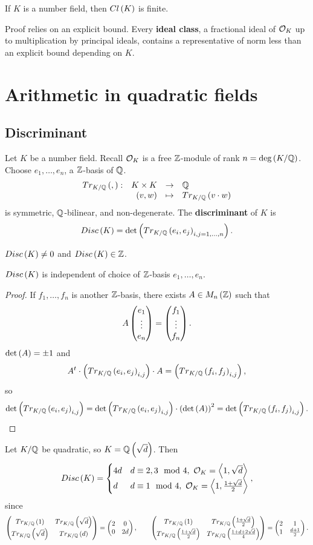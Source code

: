 \begin{theorem}
If $ K $ is a number field, then $ Cl\left( K \right) $ is finite.
\end{theorem}

Proof relies on an explicit bound. Every \textbf{ideal class}, a fractional ideal of $ \mathcal{O}_K $ up to multiplication by principal ideals, contains a representative of norm less than an explicit bound depending on $ K $.

\pagebreak

\section{Arithmetic in quadratic fields}

\subsection{Discriminant}

Let $ K $ be a number field. Recall $ \mathcal{O}_K $ is a free $ \mathbb{Z} $-module of rank $ n = \deg\left( K / \mathbb{Q} \right) $. Choose $ e_1, \dots, e_n $, a $ \mathbb{Z} $-basis of $ \mathbb{Q} $.
$$ \function[Tr_{K / \Q}\rb{,}]{K \times K}{\Q}{\rb{v, w}}{Tr_{K / \Q}\rb{v \cdot w}} $$
is symmetric, $ \mathbb{Q} $-bilinear, and non-degenerate. The \textbf{discriminant} of $ K $ is
$$ Disc\left( K \right) = \det\left( Tr_{K / \mathbb{Q}}\left( e_i, e_j \right)_{i, j = 1, \dots, n} \right). $$

\begin{remark*}
$ Disc\left( K \right) \ne 0 $ and $ Disc\left( K \right) \in \mathbb{Z} $.
\end{remark*}

\begin{lemma}
$ Disc\left( K \right) $ is independent of choice of $ \mathbb{Z} $-basis $ e_1, \dots, e_n $.
\end{lemma}

\begin{proof}
If $ f_1, \dots, f_n $ is another $ \mathbb{Z} $-basis, there exists $ A \in M_n\left( \mathbb{Z} \right) $ such that
$$ A\begin{pmatrix} e_1 \\ \vdots \\ e_n \end{pmatrix} = \begin{pmatrix} f_1 \\ \vdots \\ f_n \end{pmatrix}. $$
$ \det\left( A \right) = \pm 1 $ and
$$ A^t \cdot \left( Tr_{K / \mathbb{Q}}\left( e_i, e_j \right)_{i, j} \right) \cdot A = \left( Tr_{K / \mathbb{Q}}\left( f_i, f_j \right)_{i, j} \right), $$
so
$$ \det\left( Tr_{K / \mathbb{Q}}\left( e_i, e_j \right)_{i, j} \right) = \det\left( Tr_{K / \mathbb{Q}}\left( e_i, e_j \right)_{i, j} \right) \cdot \left( \det\left( A \right) \right)^2 = \det\left( Tr_{K / \mathbb{Q}}\left( f_i, f_j \right)_{i, j} \right). $$
\end{proof}

\begin{example*}
Let $ K / \mathbb{Q} $ be quadratic, so $ K = \mathbb{Q}\left( \sqrt{d} \right) $. Then
$$ Disc\left( K \right) =
\begin{cases}
4d & d \equiv 2, 3 \mod 4, \ \mathcal{O}_K = \left\langle 1, \sqrt{d} \right\rangle \\
d & d \equiv 1 \mod 4, \ \mathcal{O}_K = \left\langle 1, \tfrac{1 + \sqrt{d}}{2} \right\rangle
\end{cases},
$$
since
$$ \begin{pmatrix} Tr_{K / \mathbb{Q}}\left( 1 \right) & Tr_{K / \mathbb{Q}}\left( \sqrt{d} \right) \\ Tr_{K / \mathbb{Q}}\left( \sqrt{d} \right) & Tr_{K / \mathbb{Q}}\left( d \right) \end{pmatrix} = \begin{pmatrix} 2 & 0 \\ 0 & 2d \end{pmatrix}, \qquad \begin{pmatrix} Tr_{K / \mathbb{Q}}\left( 1 \right) & Tr_{K / \mathbb{Q}}\left( \tfrac{1 + \sqrt{d}}{2} \right) \\ Tr_{K / \mathbb{Q}}\left( \tfrac{1 + \sqrt{d}}{2} \right) & Tr_{K / \mathbb{Q}}\left( \tfrac{1 + d + 2\sqrt{d}}{4} \right) \end{pmatrix} = \begin{pmatrix} 2 & 1 \\ 1 & \tfrac{d + 1}{2} \end{pmatrix}. $$
\end{example*}

